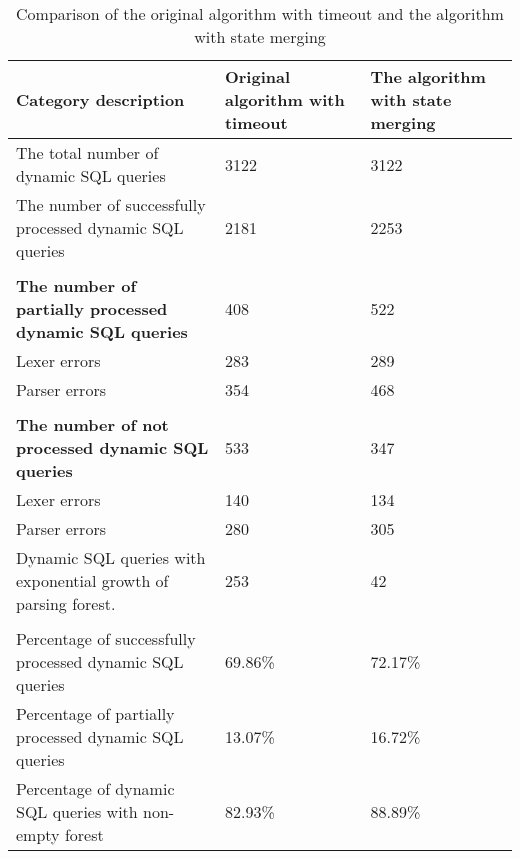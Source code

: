 \begin{center}
\begin{table}
\caption{Comparison of the original algorithm with timeout and the algorithm with state merging}
\begin{tabular}[c c c]{| p{5.5cm} | p{3cm} | p{3cm} |}
\hline
Category description & Original algorithm with timeout & The algorithm with state merging
\\
\hline
The total number of dynamic SQL queries & 3122 & 3122
\\
\hline
The number of successfully processed dynamic SQL queries & 2181 & 2253
\\
\hline
 & &
\\
\hline
\bfseries{The number of partially processed dynamic SQL queries} & 408 & 522
\\
\hline

 Lexer errors & 283 & 289
\\
\hline

 Parser errors & 354 & 468
\\
\hline
 & &
\\
\hline

\bfseries{The number of not processed dynamic SQL queries} & 533 & 347
\\
\hline
  Lexer errors & 140 & 134
\\
\hline

 Parser errors & 280 & 305
\\
\hline

 Dynamic SQL queries with exponential growth of parsing forest. & 253 & 42

\\
\hline
 & &
\\
\hline


Percentage of successfully processed dynamic SQL queries & 69.86\% & 72.17\%
\\
\hline

Percentage of partially processed dynamic SQL queries & 13.07\% & 16.72\%
\\
\hline

Percentage of dynamic SQL queries with non-empty forest & 82.93\% & 88.89\%
\\
\hline
 
\end{tabular}
\label{results}
\end{table}
\end{center}

